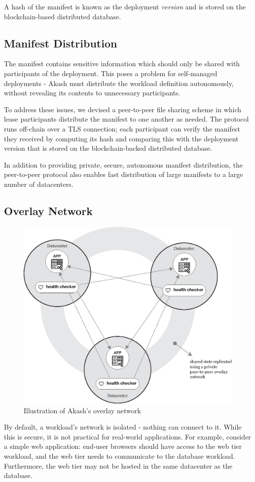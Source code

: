 \documentclass[11pt,english]{article}
\theoremstyle{definition}
\begin{document}
A hash of the manifest is known as the deployment \textit{version} and is stored on the blockchain-based distributed database.
\subsection{Manifest Distribution}
	The manifest contains sensitive information which should only be shared with participants of the deployment.  This poses a problem for self-managed deployments - Akash must distribute the workload definition autonomously, without revealing its contents to unnecessary participants.

To address these issues, we devised a peer-to-peer file sharing scheme in which lease participants distribute the manifest to one another as needed.  The protocol runs off-chain over a TLS connection; each participant can verify the manifest they received by computing its hash and comparing this with the deployment version that is stored on the blockchain-backed distributed database.

In addition to providing private, secure, autonomous manifest distribution, the peer-to-peer protocol also enables fast distribution of large manifests to a large number of datacenters.
\subsection{Overlay Network}

\begin{figure}[h]
\centering
  \includegraphics[width=0.6\linewidth]{overlay}
  \caption{Illustration of Akash's overlay network}
\end{figure}

By default, a workload's network is isolated - nothing can connect to it. While this is secure, it is not practical for real-world applications. For example, consider a simple web application: end-user browsers should have access to the web tier workload, and the web tier needs to communicate to the database workload. Furthermore, the web tier may not be hosted in the same datacenter as the database.
\end{document}
